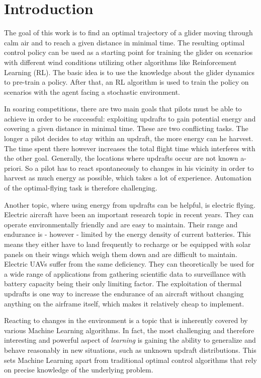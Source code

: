 
\chapter{Introduction}

The goal of this work is to find an optimal trajectory of a glider moving through calm air and to reach a given distance in minimal time. The resulting optimal control policy can be used as a starting point for training the glider on scenarios with different wind conditions utilizing other algorithms like Reinforcement Learning (RL). The basic idea is to use the knowledge about the glider dynamics to pre-train a policy. After that, an RL algorithm is used to train the policy on scenarios with the agent facing a stochastic environment.

In soaring competitions, there are two main goals that pilots must be able to achieve in order to be successful: exploiting updrafts to gain potential energy and covering a given distance in minimal time. These are two conflicting tasks. The longer a pilot decides to stay within an updraft, the more energy can he harvest. The time spent there however increases the total flight time which interferes with the other goal. Generally, the locations where updrafts occur are not known a-priori. So a pilot has to react spontaneously to changes in his vicinity in order to harvest as much energy as possible, which takes a lot of experience. Automation of the optimal-flying task is therefore challenging.

Another topic, where using energy from updrafts can be helpful, is electric flying. Electric aircraft have been an important research topic in recent years. They can operate environmentally friendly and are easy to maintain. Their range and endurance is - however - limited by the energy density of current batteries. This means they either have to land frequently to recharge or be equipped with solar panels on their wings which weigh them down and are difficult to maintain. Electric UAVs suffer from the same deficiency. They can theoretically be used for a wide range of applications from gathering scientific data to surveillance with battery capacity being their only limiting factor. The exploitation of thermal updrafts is one way to increase the endurance of an aircraft without changing anything on the airframe itself, which makes it relatively cheap to implement.

Reacting to changes in the environment is a topic that is inherently covered by various Machine Learning algorithms. In fact, the most challenging and therefore interesting and powerful aspect of \textit{learning} is gaining the ability to generalize and behave reasonably in new situations, such as unknown updraft distributions. This sets Machine Learning apart from traditional optimal control algorithms that rely on precise knowledge of the underlying problem.

